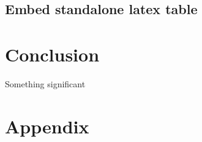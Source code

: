 \documentclass[12pt,]{article}
\begin{document}
\hypertarget{embed-standalone-latex-table}{%
\subsection{Embed standalone latex
table}\label{embed-standalone-latex-table}}

\vspace{5mm}

\vspace{5mm}

\hypertarget{conclusion}{%
\section{Conclusion}\label{conclusion}}

Something significant

\hypertarget{appendix}{%
\section{Appendix}\label{appendix}}




\newpage
\singlespacing
\printbibliography[title=Bibliography]
\end{document}
